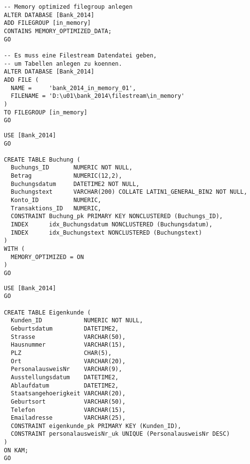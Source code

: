 \begin{enumerate}
\begin{lstlisting}[language=ms_sql]
-- Memory optimized filegroup anlegen
ALTER DATABASE [Bank_2014] 
ADD FILEGROUP [in_memory]
CONTAINS MEMORY_OPTIMIZED_DATA; 
GO

-- Es muss eine Filestream Datendatei geben,
-- um Tabellen anlegen zu koennen.
ALTER DATABASE [Bank_2014]
ADD FILE (
  NAME =     'bank_2014_in_memory_01',
  FILENAME = 'D:\u01\bank_2014\filestream\in_memory'
)
TO FILEGROUP [in_memory]
GO
        \end{lstlisting}
\clearpage        
                
        \begin{lstlisting}[language=ms_sql]
USE [Bank_2014]
GO

CREATE TABLE Buchung (
  Buchungs_ID       NUMERIC NOT NULL,
  Betrag            NUMERIC(12,2),
  Buchungsdatum     DATETIME2 NOT NULL,
  Buchungstext      VARCHAR(200) COLLATE LATIN1_GENERAL_BIN2 NOT NULL,
  Konto_ID          NUMERIC,
  Transaktions_ID   NUMERIC,
  CONSTRAINT Buchung_pk PRIMARY KEY NONCLUSTERED (Buchungs_ID),
  INDEX      idx_Buchungsdatum NONCLUSTERED (Buchungsdatum),
  INDEX      idx_Buchungstext NONCLUSTERED (Buchungstext)
)
WITH (
  MEMORY_OPTIMIZED = ON
)
GO
        \end{lstlisting}
        
        \begin{lstlisting}[language=ms_sql]
USE [Bank_2014]
GO

CREATE TABLE Eigenkunde (
  Kunden_ID            NUMERIC NOT NULL,
  Geburtsdatum         DATETIME2,
  Strasse              VARCHAR(50),
  Hausnummer           VARCHAR(15),
  PLZ                  CHAR(5),
  Ort                  VARCHAR(20),
  PersonalausweisNr    VARCHAR(9),
  Ausstellungsdatum    DATETIME2,
  Ablaufdatum          DATETIME2,
  Staatsangehoerigkeit VARCHAR(20),
  Geburtsort           VARCHAR(50),
  Telefon              VARCHAR(15),
  Emailadresse         VARCHAR(25),
  CONSTRAINT eigenkunde_pk PRIMARY KEY (Kunden_ID),
  CONSTRAINT personalausweisNr_uk UNIQUE (PersonalausweisNr DESC)
)
ON KAM;
GO
        \end{lstlisting}
      

\end{enumerate}
